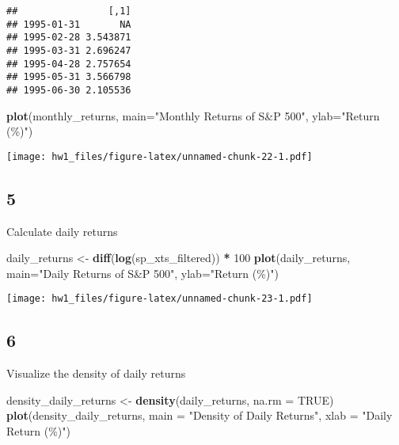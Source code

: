\documentclass[
]{article}
\newenvironment{Shaded}{\begin{snugshade}}{\end{snugshade}}
\newcommand{\AttributeTok}[1]{\textcolor[rgb]{0.13,0.29,0.53}{#1}}
\newcommand{\ConstantTok}[1]{\textcolor[rgb]{0.56,0.35,0.01}{#1}}
\newcommand{\DecValTok}[1]{\textcolor[rgb]{0.00,0.00,0.81}{#1}}
\newcommand{\FunctionTok}[1]{\textcolor[rgb]{0.13,0.29,0.53}{\textbf{#1}}}
\newcommand{\NormalTok}[1]{#1}
\newcommand{\OtherTok}[1]{\textcolor[rgb]{0.56,0.35,0.01}{#1}}
\newcommand{\SpecialCharTok}[1]{\textcolor[rgb]{0.81,0.36,0.00}{\textbf{#1}}}
\newcommand{\StringTok}[1]{\textcolor[rgb]{0.31,0.60,0.02}{#1}}
\begin{document}
\begin{verbatim}
##                [,1]
## 1995-01-31       NA
## 1995-02-28 3.543871
## 1995-03-31 2.696247
## 1995-04-28 2.757654
## 1995-05-31 3.566798
## 1995-06-30 2.105536
\end{verbatim}

\begin{Shaded}
\begin{Highlighting}[]
\FunctionTok{plot}\NormalTok{(monthly\_returns, }\AttributeTok{main=}\StringTok{"Monthly Returns of S\&P 500"}\NormalTok{, }\AttributeTok{ylab=}\StringTok{"Return (\%)"}\NormalTok{)}
\end{Highlighting}
\end{Shaded}

\texttt{[image: hw1\_files/figure-latex/unnamed-chunk-22-1.pdf]}

\subsection{5}\label{section-4}

Calculate daily returns

\begin{Shaded}
\begin{Highlighting}[]
\NormalTok{daily\_returns }\OtherTok{\textless{}{-}} \FunctionTok{diff}\NormalTok{(}\FunctionTok{log}\NormalTok{(sp\_xts\_filtered)) }\SpecialCharTok{*} \DecValTok{100}
\FunctionTok{plot}\NormalTok{(daily\_returns, }\AttributeTok{main=}\StringTok{"Daily Returns of S\&P 500"}\NormalTok{, }\AttributeTok{ylab=}\StringTok{"Return (\%)"}\NormalTok{)}
\end{Highlighting}
\end{Shaded}

\texttt{[image: hw1\_files/figure-latex/unnamed-chunk-23-1.pdf]}

\subsection{6}\label{section-5}

Visualize the density of daily returns

\begin{Shaded}
\begin{Highlighting}[]
\NormalTok{density\_daily\_returns }\OtherTok{\textless{}{-}} \FunctionTok{density}\NormalTok{(daily\_returns, }\AttributeTok{na.rm =} \ConstantTok{TRUE}\NormalTok{)}
\FunctionTok{plot}\NormalTok{(density\_daily\_returns, }\AttributeTok{main =} \StringTok{"Density of Daily Returns"}\NormalTok{, }\AttributeTok{xlab =} \StringTok{"Daily Return (\%)"}\NormalTok{)}
\end{Highlighting}
\end{Shaded}
\end{document}
